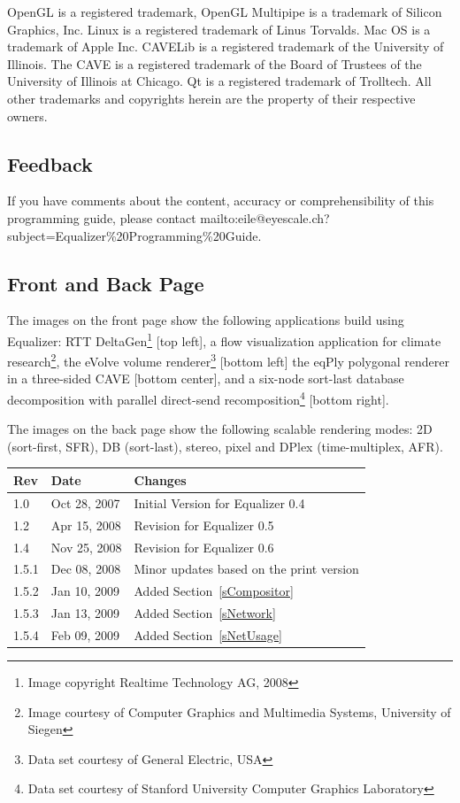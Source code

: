 \documentclass[10pt,a4]{scrartcl}
\newcommand{\sref}[1]{Section~\ref{#1}}
\begin{document}
OpenGL is a registered trademark, OpenGL Multipipe is a trademark of
Silicon Graphics, Inc. Linux is a registered trademark of Linus
Torvalds.  Mac OS is a trademark of Apple Inc. CAVELib is a registered
trademark of the University of Illinois. The CAVE is a registered
trademark of the Board of Trustees of the University of Illinois at
Chicago. Qt is a registered trademark of Trolltech. All other
trademarks and copyrights herein are the property of their respective
owners.

\subsection*{Feedback}

If you have comments about the content, accuracy or comprehensibility of
this programming guide, please contact
{mailto:eile@eyescale.ch?subject=Equalizer\%20Programming\%20Guide}.

\vfill

\subsection*{Front and Back Page}

The images on the front page show the following applications build using
Equalizer: RTT DeltaGen\footnote{Image copyright Realtime Technology AG,
  2008} [top left], a flow visualization application for climate
research\footnote{Image courtesy of Computer Graphics and Multimedia
  Systems, University of Siegen}, the \textsf{eVolve} volume
renderer\footnote{Data set courtesy of General Electric, USA} [bottom
left] the \textsf{eqPly} polygonal renderer in a three-sided CAVE
[bottom center], and a six-node sort-last database decomposition with
parallel direct-send recomposition\footnote{Data set courtesy of
  Stanford University Computer Graphics Laboratory} [bottom right].

The images on the back page show the following scalable rendering modes:
2D (sort-first, SFR), DB (sort-last), stereo, pixel and DPlex
(time-multiplex, AFR).

\clearpage
{}
\pagestyle{headings}
\tableofcontents
\listoffigures
\vfill{\center\begin{tabularx}{\textwidth}{|l|l|X|}
    \hline
    \bf Rev & \bf Date     & \bf Changes \\
    \hline
    1.0     & Oct 28, 2007 & Initial Version for Equalizer 0.4\\
    1.2     & Apr 15, 2008 & Revision for Equalizer 0.5\\
    1.4     & Nov 25, 2008 & Revision for Equalizer 0.6\\
    1.5.1   & Dec 08, 2008 & Minor updates based on the print version\\
    1.5.2   & Jan 10, 2009 & Added \sref{sCompositor}\\
    1.5.3   & Jan 13, 2009 & Added \sref{sNetwork}\\
    1.5.4   & Feb 09, 2009 & Added \sref{sNetUsage}\\
    \hline
  \end{tabularx}}
\clearpage
\end{document}

